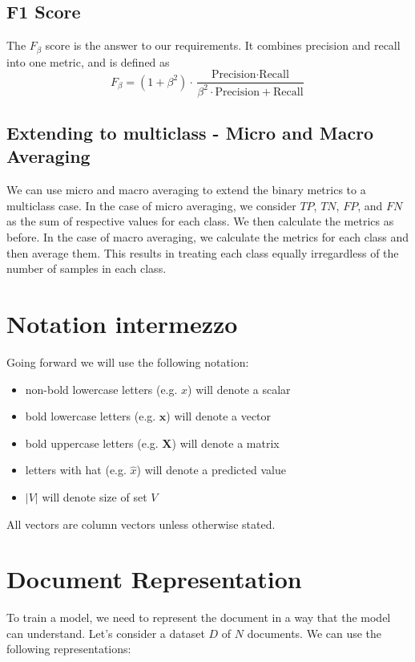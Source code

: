 \subsection{F1 Score}
The $F_{\beta}$ score is the answer to our requirements.
It combines precision and recall into one metric, and is defined as
\begin{equation}
    \label{eq:f1}
    F_{\beta} = (1 + \beta^2) \cdot \frac{\text{Precision} \cdot \text{Recall}}{\beta^2 \cdot \text{Precision} + \text{Recall}}
\end{equation}

\subsection{Extending to multiclass - Micro and Macro Averaging}
We can use micro and macro averaging to extend the binary metrics to a multiclass case.
In the case of micro averaging, we consider $TP$, $TN$, $FP$, and $FN$ as the sum of respective values for each class.
We then calculate the metrics as before.
In the case of macro averaging, we calculate the metrics for each class and then average them.
This results in treating each class equally irregardless of the number of samples in each class.

\section{Notation intermezzo}
\label{sec:notation}
Going forward we will use the following notation:
\begin{itemize}
    \item non-bold lowercase letters (e.g. $x$) will denote a scalar
    \item bold lowercase letters (e.g. $\mathbf{x}$) will denote a vector
    \item bold uppercase letters (e.g. $\mathbf{X}$) will denote a matrix
    \item letters with hat (e.g. $\hat{x}$) will denote a predicted value
    \item $|V|$ will denote size of set $V$
\end{itemize}
All vectors are column vectors unless otherwise stated.

\section{Document Representation}
\label{sec:representation}
To train a model, we need to represent the document in a way that the model can understand.
Let's consider a dataset $D$ of $N$ documents. We can use the following representations:

